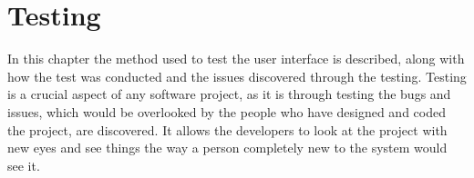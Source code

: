 \chapter{Testing}

In this chapter the method used to test the user interface is described, along with how the test was conducted and the issues discovered through the testing. Testing is a crucial aspect of any software project, as it is through testing the bugs and issues, which would be overlooked by the people who have designed and coded the project, are discovered. It allows the developers to look at the project with new eyes and see things the way a person completely new to the system would see it.


